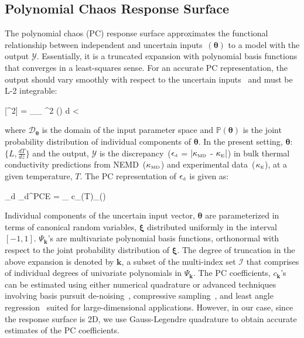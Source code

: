 \subsection{Polynomial Chaos Response Surface}

The polynomial chaos (PC) response surface approximates the functional relationship between independent and uncertain 
inputs~$(\bm{\theta})$ to a model with the output $\mathcal{Y}$. Essentially, it is a truncated expansion with polynomial 
basis functions that converges in a least-squares sense. For an accurate PC representation, the output should
vary smoothly with respect to the uncertain inputs~\cite{Vohra:2014}  and must
be L-2 integrable:

\be
{}[^2] = \int_{_{\bm{\theta}}} ^2 (\bm{\theta}) 
d\bm{\theta} < \infty
\ee

\noindent where $\mathcal{D}_{\bm{\theta}}$ is the domain of the input parameter space and 
$\mathbb{P}(\bm{\theta})$ is the joint probability distribution of individual components of $\bm{\theta}$.
In the present setting, $\bm{\theta}$:~$\{L,\frac{dT}{dz}\}$ and the output, $\mathcal{Y}$ is the
discrepancy~($\epsilon_{\mbox{\tiny{d}}}$ = 
$\lvert\kappa_{\mbox{\tiny{MD}}}$ - $\kappa_{\mbox{\tiny{E}}}\rvert$)
in bulk thermal conductivity predictions from 
NEMD~($\kappa_{\mbox{\tiny{MD}}}$) and experimental data~($\kappa_{\mbox{\tiny{E}}}$), at a 
given temperature, $T$. The PC representation of $\epsilon_{\mbox{\tiny{d}}}$ is given as:

\be
\epsilon_{\mbox{\tiny{d}}} \approx \mathcal{\epsilon}_{\mbox{\tiny{d}}}^{\mbox{\tiny{PCE}}} = 
\sum_{\in{}} c_{}(T)\Psi_{}(\bm{\xi(\theta)}) 
\ee

\noindent Individual components of the uncertain input vector, $\bm{\theta}$ are parameterized in terms of canonical random 
variables, $\bm{\xi}$ distributed uniformly in the interval $[-1,1]$. 
 $\Psi_{\bm{k}}$'s are multivariate polynomial basis functions, orthonormal with respect to the joint probability 
 distribution of $\bm{\xi}$. The degree of truncation in the above expansion is denoted by $\bm{k}$, a subset of
 the multi-index set $\mathcal{I}$ that comprises of individual degrees of univariate polynomials in $\Psi_{\bm{k}}$.
The PC coefficients, $c_{\bm{k}}$'s can be estimated using either numerical quadrature or advanced techniques
involving basis pursuit de-noising~\cite{Peng:2014}, compressive
sampling~\cite{Hampton:2015}, and least angle regression~\cite{Blatman:2011} suited for large-dimensional
applications. However, in our case, since the response surface is 2D, we use Gauss-Legendre quadrature to
obtain accurate estimates of the PC coefficients. 
\bigskip

